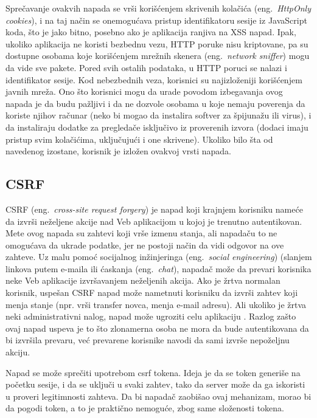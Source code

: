 \documentclass[a4paper]{article}
\begin{document}
Sprečavanje ovakvih napada se vrši korišćenjem skrivenih kolačića (eng.~{\em HttpOnly cookies}), i na taj način se onemogućava pristup identifikatoru sesije iz JavaScript koda, što je jako bitno, posebno ako je aplikacija ranjiva na XSS napad. Ipak, ukoliko aplikacija ne koristi bezbednu vezu, HTTP poruke nisu kriptovane, pa su dostupne osobama koje korišćenjem mrežnih skenera (eng.~{\em network sniffer}) mogu da vide sve pakete. Pored svih ostalih podataka, u HTTP poruci se nalazi i identifikator sesije. Kod nebezbednih veza, korisnici su najizloženiji korišćenjem javnih mreža. Ono što korisnici mogu da urade povodom izbegavanja ovog napada je da budu pažljivi i da ne dozvole osobama u koje nemaju poverenja da koriste njihov računar (neko bi mogao da instalira softver za špijunažu ili virus), i da instaliraju dodatke za pregledače isključivo iz proverenih izvora (dodaci imaju pristup svim kolačićima, uključujući i one skrivene). Ukoliko bilo šta od navedenog izostane, korisnik je izložen ovakvoj vrsti napada.

\subsection{CSRF}
\label{subsec:csrf}
CSRF (eng.~{\em cross-site request forgery}) je napad koji krajnjem korisniku nameće da izvrši neželjene akcije nad Veb aplikacijom u kojoj je trenutno autentikovan. Mete ovog napada su zahtevi koji vrše izmenu stanja, ali napadaču to ne omogućava da ukrade podatke, jer ne postoji način da vidi odgovor na ove zahteve. Uz malu pomoć socijalnog inžinjeringa (eng.~{\em social engineering}) (slanjem linkova putem e-maila ili ćaskanja (eng.~{\em chat}), napadač može da prevari korisnika neke Veb aplikacije izvršavanjem neželjenih akcija. Ako je žrtva normalan korisnik, uspešan CSRF napad može nametnuti korisniku da izvrši zahtev koji menja stanje (npr. vrši transfer novca, menja e-mail adresu). Ali ukoliko je žrtva neki administrativni nalog, napad može ugroziti celu aplikaciju \cite{csrf1}. Razlog zašto ovaj napad uspeva je to što zlonamerna osoba ne mora da bude autentikovana da bi izvršila prevaru, već prevarene korisnike navodi da sami izvrše nepoželjnu akciju.

Napad se može sprečiti upotrebom csrf tokena. Ideja je da se token generiše na početku sesije, i da se uključi u svaki zahtev, tako da server može da ga iskoristi u proveri legitimnosti zahteva. Da bi napadač zaobišao ovaj mehanizam, morao bi da pogodi token, a to je praktično nemoguće, zbog same složenosti tokena.
\end{document}

